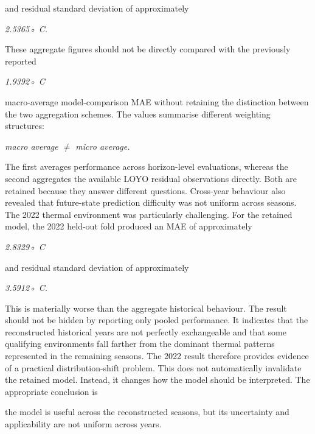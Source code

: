 and residual standard deviation of approximately

\begin{center}\textit{2.5365◦ C.}\end{center}

These aggregate figures should not be directly compared with the previously reported

\begin{center}\textit{1.9392◦ C}\end{center}

macro-average model-comparison MAE without retaining the distinction between the two aggregation schemes. The values summarise different weighting structures:

\begin{center}\textit{macro average \ensuremath{\neq} micro average.}\end{center}

The first averages performance across horizon-level evaluations, whereas the second aggregates the available LOYO residual observations directly. Both are retained because they answer different questions. Cross-year behaviour also revealed that future-state prediction difficulty was not uniform across seasons. The 2022 thermal environment was particularly challenging. For the retained model, the 2022 held-out fold produced an MAE of approximately

\begin{center}\textit{2.8329◦ C}\end{center}

and residual standard deviation of approximately

\begin{center}\textit{3.5912◦ C.}\end{center}

This is materially worse than the aggregate historical behaviour. The result should not be hidden by reporting only pooled performance. It indicates that the reconstructed historical years are not perfectly exchangeable and that some qualifying environments fall farther from the dominant thermal patterns represented in the remaining seasons. The 2022 result therefore provides evidence of a practical distribution-shift problem. This does not automatically invalidate the retained model. Instead, it changes how the model should be interpreted. The appropriate conclusion is

the model is useful across the reconstructed seasons, but its uncertainty and applicability are not uniform across years.

